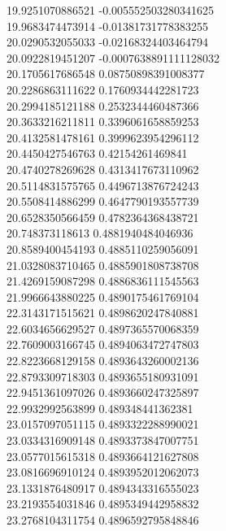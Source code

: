 {19.9251070886521 -0.005552503280341625
 \\
19.9683474473914 -0.01381731778383255
 \\
20.0290532055033 -0.02168324403464794
 \\
20.0922819451207 -0.0007638891111128032
 \\
20.1705617686548 0.08750898391008377
 \\
20.2286863111622 0.1760934442281723
 \\
20.2994185121188 0.2532344460487366
 \\
20.3633216211811 0.3396061658859253
 \\
20.4132581478161 0.3999623954296112
 \\
20.4450427546763 0.42154261469841
 \\
20.4740278269628 0.4313417673110962
 \\
20.5114831575765 0.4496713876724243
 \\
20.5508414886299 0.4647790193557739
 \\
20.6528350566459 0.4782364368438721
 \\
20.748373118613 0.4881940484046936
 \\
20.8589400454193 0.4885110259056091
 \\
21.0328083710465 0.4885901808738708
 \\
21.4269159087298 0.4886836111545563
 \\
21.9966643880225 0.4890175461769104
 \\
22.3143171515621 0.4898620247840881
 \\
22.6034656629527 0.4897365570068359
 \\
22.7609003166745 0.4894063472747803
 \\
22.8223668129158 0.4893643260002136
 \\
22.8793309718303 0.4893655180931091
 \\
22.9451361097026 0.4893660247325897
 \\
22.9932992563899 0.489348441362381
 \\
23.0157097051115 0.4893322288990021
 \\
23.0334316909148 0.4893373847007751
 \\
23.0577015615318 0.4893664121627808
 \\
23.0816696910124 0.4893952012062073
 \\
23.1331876480917 0.4894343316555023
 \\
23.2193554031846 0.4895349442958832
 \\
23.2768104311754 0.4896592795848846
}

